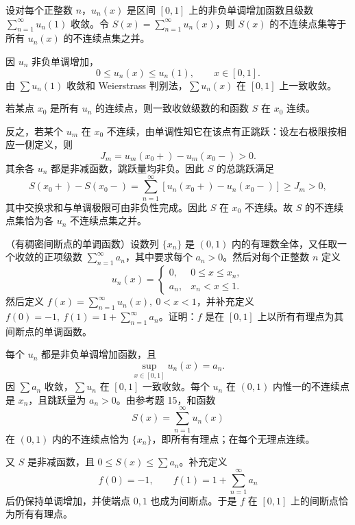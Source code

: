 \begin{xreferenceproblem}[15]
设对每个正整数 $n$，$u_n(x)$ 是区间 $[0,1]$ 上的非负单调增加函数且级数 $\sum_{n=1}^{\infty}u_n(1)$ 收敛。令 $S(x)=\sum_{n=1}^{\infty}u_n(x)$，则 $S(x)$ 的不连续点集等于所有 $u_n(x)$ 的不连续点集之并。
\end{xreferenceproblem}
\begin{xsolution}
因 $u_n$ 非负单调增加，
\[
  0\leqslant u_n(x)\leqslant u_n(1),
  \qquad x\in[0,1].
\]
由 $\sum u_n(1)$ 收敛和 Weierstrass 判别法，$\sum u_n(x)$ 在 $[0,1]$ 上一致收敛。

若某点 $x_0$ 是所有 $u_n$ 的连续点，则一致收敛级数的和函数 $S$ 在 $x_0$ 连续。

反之，若某个 $u_m$ 在 $x_0$ 不连续，由单调性知它在该点有正跳跃：设左右极限按相应一侧定义，则
\[
  J_m=u_m(x_0+)-u_m(x_0-)>0.
\]
其余各 $u_n$ 都是非减函数，跳跃量均非负。因此 $S$ 的总跳跃满足
\[
  S(x_0+)-S(x_0-)
  =\sum_{n=1}^{\infty}[u_n(x_0+)-u_n(x_0-)]
  \geqslant J_m>0,
\]
其中交换求和与单调极限可由非负性完成。因此 $S$ 在 $x_0$ 不连续。故 $S$ 的不连续点集恰为各 $u_n$ 不连续点集之并。
\end{xsolution}


\begin{xreferenceproblem}[16]
（有稠密间断点的单调函数）设数列 $\{x_n\}$ 是 $(0,1)$ 内的有理数全体，又任取一个收敛的正项级数 $\sum_{n=1}^{\infty}a_n$，其中要求每个 $a_n>0$。然后对每个正整数 $n$ 定义
\[
  u_n(x)=
  \begin{cases}
    0,&0\leqslant x\leqslant x_n,\\
    a_n,&x_n<x\leqslant1.
  \end{cases}
\]
然后定义 $f(x)=\sum_{n=1}^{\infty}u_n(x),\ 0<x<1$，并补充定义 $f(0)=-1,\ f(1)=1+\sum_{n=1}^{\infty}a_n$。证明：$f$ 是在 $[0,1]$ 上以所有有理点为其间断点的单调函数。
\end{xreferenceproblem}
\begin{xsolution}
每个 $u_n$ 都是非负单调增加函数，且
\[
  \sup_{x\in[0,1]}u_n(x)=a_n.
\]
因 $\sum a_n$ 收敛，$\sum u_n$ 在 $[0,1]$ 一致收敛。每个 $u_n$ 在 $(0,1)$ 内惟一的不连续点是 $x_n$，且跳跃量为 $a_n>0$。由参考题 15，和函数
\[
  S(x)=\sum_{n=1}^{\infty}u_n(x)
\]
在 $(0,1)$ 内的不连续点恰为 $\{x_n\}$，即所有有理点；在每个无理点连续。

又 $S$ 是非减函数，且 $0\leqslant S(x)\leqslant\sum a_n$。补充定义
\[
  f(0)=-1,
  \qquad f(1)=1+\sum_{n=1}^{\infty}a_n
\]
后仍保持单调增加，并使端点 $0,1$ 也成为间断点。于是 $f$ 在 $[0,1]$ 上的间断点恰为所有有理点。
\end{xsolution}


